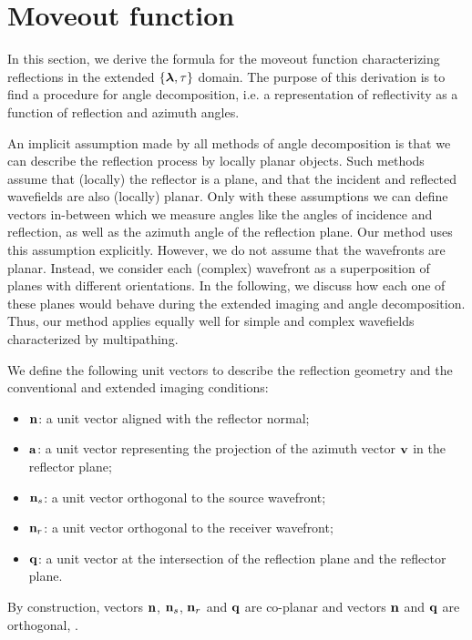 \section{Moveout function}

In this section, we derive the formula for the moveout function
characterizing reflections in the extended $\{\hh,\tt\}$ domain. The
purpose of this derivation is to find a procedure for angle
decomposition, i.e. a representation of reflectivity as a function of
reflection and azimuth angles.

An implicit assumption made by all methods of angle decomposition is
that we can describe the reflection process by locally planar
objects. Such methods assume that (locally) the reflector is a plane,
and that the incident and reflected wavefields are also (locally)
planar. Only with these assumptions we can define vectors in-between
which we measure angles like the angles of incidence and reflection,
as well as the azimuth angle of the reflection plane. Our method uses
this assumption explicitly.
%
However, we do not assume that the wavefronts are planar. Instead, we
consider each (complex) wavefront as a superposition of planes with
different orientations. In the following, we discuss how each one of
these planes would behave during the extended imaging and angle
decomposition. Thus, our method applies equally well for simple and
complex wavefields characterized by multipathing. 

We define the following unit vectors to describe the reflection
geometry and the conventional and extended imaging conditions:
\begin{itemize}
   \item $\nn$: a unit vector aligned with the reflector normal;
   \item $\aa$: a unit vector representing the projection of the azimuth
     vector $\vv$ in the reflector plane;
   \item $\ns$: a unit vector orthogonal to the source wavefront;
   \item $\nr$: a unit vector orthogonal to the receiver wavefront;
   \item $\qq$: a unit vector at the intersection of the reflection
     plane and the reflector plane.
\end{itemize}
By construction, vectors $\nn$, $\ns$, $\nr$ and $\qq$ are co-planar
and vectors $\nn$ and $\qq$ are orthogonal, .

